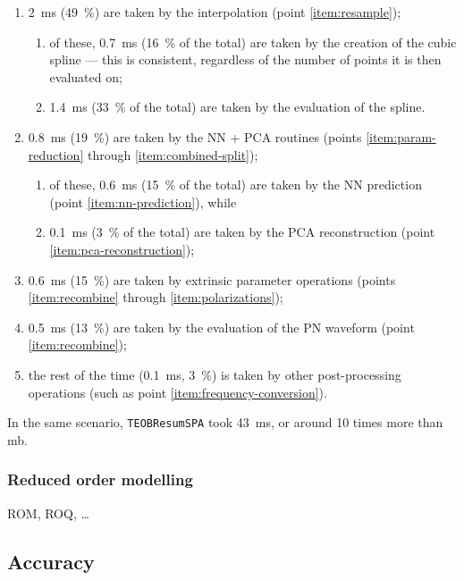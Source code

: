 \documentclass[main.tex]{subfiles}
\begin{document}
\begin{enumerate}
    \item \SI{2}{ms} (\SI{49}{\%}) are taken by the interpolation (point \ref{item:resample});
    \begin{enumerate}
        \item of these, \SI{0.7}{ms} (\SI{16}{\%} of the total) are taken by the creation of the cubic spline --- this is consistent, regardless of the number of points it is then evaluated on; 
        \item \SI{1.4}{ms} (\SI{33}{\%} of the total) are taken by the evaluation of the spline.
    \end{enumerate}
    \item \SI{0.8}{ms} (\SI{19}{\%}) are taken by the \ac{NN} + \ac{PCA} routines (points \ref{item:param-reduction} through \ref{item:combined-split});
    \begin{enumerate}
        \item of these, \SI{0.6}{ms} (\SI{15}{\%} of the total) are taken by the \ac{NN} prediction (point \ref{item:nn-prediction}), while
        \item \SI{0.1}{ms} (\SI{3}{\%} of the total) are taken by the \ac{PCA} reconstruction (point \ref{item:pca-reconstruction});
    \end{enumerate}
    \item \SI{0.6}{ms} (\SI{15}{\%}) are taken by extrinsic parameter operations (points \ref{item:recombine} through \ref{item:polarizations});
    \item \SI{0.5}{ms} (\SI{13}{\%}) are taken by the evaluation of the \ac{PN} waveform (point \ref{item:recombine});
    \item the rest of the time (\SI{0.1}{ms}, \SI{3}{\%}) is taken by other post-processing operations (such as point \ref{item:frequency-conversion}).
\end{enumerate}

In the same scenario, \texttt{TEOBResumSPA} took \SI{43}{ms}, or around 10 times more than \ac{mb}. 

\subsubsection{Reduced order modelling}

ROM, ROQ, \dots



\textcite[]{vinciguerraAcceleratingGravitationalWave2017}

\subsection{Accuracy} \label{sec:accuracy}
\end{document}

